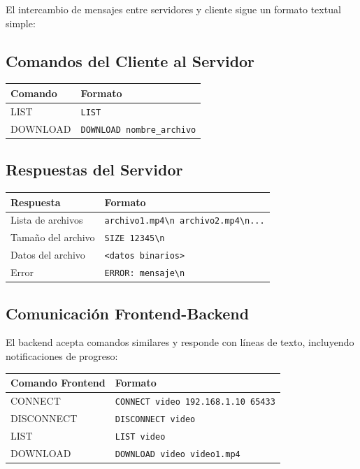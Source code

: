 \documentclass[12pt]{article}
\begin{document}
El intercambio de mensajes entre servidores y cliente sigue un formato textual simple:

\subsection{Comandos del Cliente al Servidor}
\begin{table}[H]
\centering
\begin{tabular}{|l|l|}
\hline
\textbf{Comando} & \textbf{Formato} \\
\hline
LIST & \texttt{LIST} \\
DOWNLOAD & \texttt{DOWNLOAD nombre\_archivo} \\
\hline
\end{tabular}
\end{table}

\subsection{Respuestas del Servidor}
\begin{table}[H]
\centering
\begin{tabular}{|l|l|}
\hline
\textbf{Respuesta} & \textbf{Formato} \\
\hline
Lista de archivos & \texttt{archivo1.mp4\textbackslash n archivo2.mp4\textbackslash n...} \\
Tamaño del archivo & \texttt{SIZE 12345\textbackslash n} \\
Datos del archivo & \texttt{<datos binarios>} \\
Error & \texttt{ERROR: mensaje\textbackslash n} \\
\hline
\end{tabular}
\end{table}

\subsection{Comunicación Frontend-Backend}
El backend acepta comandos similares y responde con líneas de texto, incluyendo notificaciones de progreso:

\begin{table}[H]
\centering
\begin{tabular}{|l|l|}
\hline
\textbf{Comando Frontend} & \textbf{Formato} \\
\hline
CONNECT & \texttt{CONNECT video 192.168.1.10 65433} \\
DISCONNECT & \texttt{DISCONNECT video} \\
LIST & \texttt{LIST video} \\
DOWNLOAD & \texttt{DOWNLOAD video video1.mp4} \\
\hline
\end{tabular}
\end{table}
\end{document}
